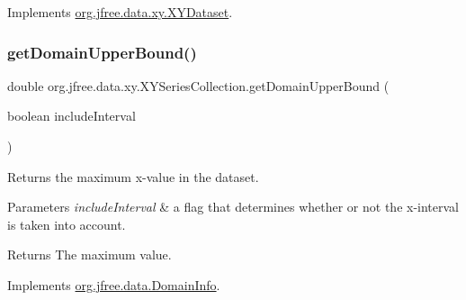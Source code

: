 Implements \mbox{\hyperlink{interfaceorg_1_1jfree_1_1data_1_1xy_1_1_x_y_dataset_a49306db52a1ea7de951d807d21ab9c7c}{org.\+jfree.\+data.\+xy.\+X\+Y\+Dataset}}.

\mbox{\label{classorg_1_1jfree_1_1data_1_1xy_1_1_x_y_series_collection_af943c8f3bbfd29d446a6af8018d9d8b1}} 
\subsubsection{\texorpdfstring{get\+Domain\+Upper\+Bound()}{getDomainUpperBound()}}
{\footnotesize\ttfamily double org.\+jfree.\+data.\+xy.\+X\+Y\+Series\+Collection.\+get\+Domain\+Upper\+Bound (\begin{DoxyParamCaption}\item[{boolean}]{include\+Interval }\end{DoxyParamCaption})}

Returns the maximum x-\/value in the dataset.


\begin{DoxyParams}{Parameters}
{\em include\+Interval} & a flag that determines whether or not the x-\/interval is taken into account.\\
\hline
\end{DoxyParams}
\begin{DoxyReturn}{Returns}
The maximum value. 
\end{DoxyReturn}


Implements \mbox{\hyperlink{interfaceorg_1_1jfree_1_1data_1_1_domain_info_a00e455f8db5bd8515266000cacc74e89}{org.\+jfree.\+data.\+Domain\+Info}}.

\mbox{\label{classorg_1_1jfree_1_1data_1_1xy_1_1_x_y_series_collection_a3a34b01823ad4f798a5f65e23096d1b5}} 
